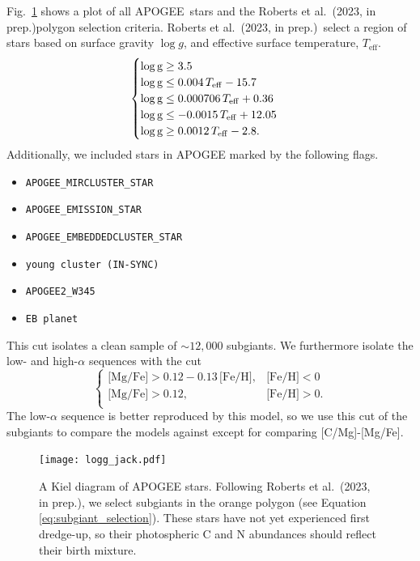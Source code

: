 \documentclass[fleqn,usenatbib]{mnras}
\newcommand{\citetjack}{Roberts et al.~(2023, in prep.)}
\newcommand{\apogee}{APOGEE}
\newcommand{\caafe}{[C/Mg]-[Mg/Fe]}
\newcommand{\about}[1]{${\sim} #1$}
\begin{document}
Fig.~\ref{fig:subgiant_selection} shows a plot of all \apogee\ stars and the \citetjack polygon selection criteria. 
 \citetjack~select a region of stars based on surface gravity $\log g$, and effective surface temperature, $T_\text{eff}$.
 \begin{equation}
    \begin{cases} \label{eq:subgiant_selection}
        \log \text{g} \geq 3.5 \\
        \log \text{g} \leq 0.004\,T_{\rm eff} - 15.7 \\
        \log \text{g} \leq 0.000706\,T_{\rm eff} + 0.36 \\
        \log \text{g} \leq -0.0015\,T_{\rm eff} + 12.05 \\
        \log \text{g} \geq 0.0012\,T_{\rm eff} - 2.8. \\
    \end{cases}
\end{equation}
Additionally, we included stars in \apogee{} marked by the following flags.
\begin{itemize}
\item \verb|APOGEE_MIRCLUSTER_STAR|
\item \verb|APOGEE_EMISSION_STAR|
\item \verb|APOGEE_EMBEDDEDCLUSTER_STAR|
\item \verb|young cluster (IN-SYNC)|
\item \verb|APOGEE2_W345|
\item \verb|EB planet|
\end{itemize}
This cut isolates a clean sample of \about{12,000} subgiants.
We furthermore isolate the low- and high-$\alpha$ sequences with the cut
\begin{equation}\label{eq:high_alpha}
\begin{cases}
\text{[Mg/Fe]} >0.12-0.13\,\text{[Fe/H]}, & \text{[Fe/H]}<0\\
\text{[Mg/Fe]} >0.12, & \text{[Fe/H]}>0. \\
\end{cases}
\end{equation}
The low-$\alpha$ sequence is better reproduced by this model, so we use this cut of the subgiants to compare the models against except for comparing \caafe. 




\begin{figure}
    \centering
    \texttt{[image: logg\_jack.pdf]}
    \caption[Subgiant Selection]{
        A Kiel diagram of \apogee{} stars. Following \citetjack, we select subgiants in the orange polygon (see Equation \ref{eq:subgiant_selection}). These stars have not yet experienced first dredge-up, so their photospheric C and N abundances should reflect their birth mixture.
    }
    \label{fig:subgiant_selection}
\end{figure}
\end{document}
